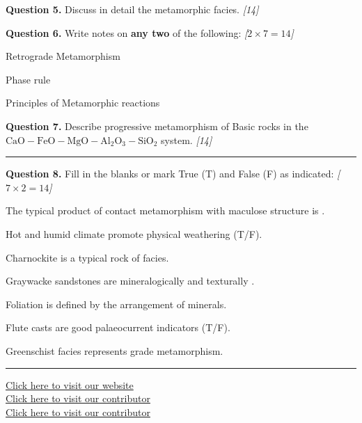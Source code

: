 \documentclass[11pt,a4paper]{article}
\newcommand{\pts}[1]{\hfill   \textit{[#1]}}
\begin{document}
\medskip


\noindent   \textbf{Question 5.} Discuss in detail the metamorphic facies. \pts{14}

\medskip


\noindent   \textbf{Question 6.} Write notes on   \textbf{any two} of the following: \pts{$2  \times 7 = 14$}

\begin{parts}
  \item Retrograde Metamorphism
  \item Phase rule
  \item Principles of Metamorphic reactions
\end{parts}

\medskip


\noindent   \textbf{Question 7.} Describe progressive metamorphism of Basic rocks in the $ \text{CaO}- \text{FeO}- \text{MgO}- \text{Al}_2 \text{O}_3- \text{SiO}_2$ system. \pts{14}

\bigskip


\rule{\linewidth}{0.4pt}\smallskip




\noindent   \textbf{Question 8.} Fill in the blanks or mark True (T) and False (F) as indicated: \pts{$7  \times 2 = 14$}

\begin{parts}
  \item The typical product of contact metamorphism with maculose structure is \underline{\hspace{4cm}}.
  \item Hot and humid climate promote physical weathering (T/F). \underline{\hspace{1cm}}
  \item Charnockite is a typical rock of \underline{\hspace{3cm}} facies.
  \item Graywacke sandstones are mineralogically and texturally \underline{\hspace{4cm}}.
  \item Foliation is defined by the \underline{\hspace{4cm}} arrangement of minerals.
  \item Flute casts are good palaeocurrent indicators (T/F). \underline{\hspace{1.5cm}}
  \item Greenschist facies represents \underline{\hspace{3cm}} grade metamorphism.
\end{parts}

\vfill\rule{\linewidth}{0.4pt}

\begin{center}\small
\href{https://bhu-exam.vercel.app/}{Click here to visit our website}\\[4pt]
\href{https://me-aryan.vercel.app/}{Click here to visit our contributor}\\[4pt]
\href{https://quashan-me.vercel.app/}{Click here to visit our contributor}
\end{center}
\end{document}
